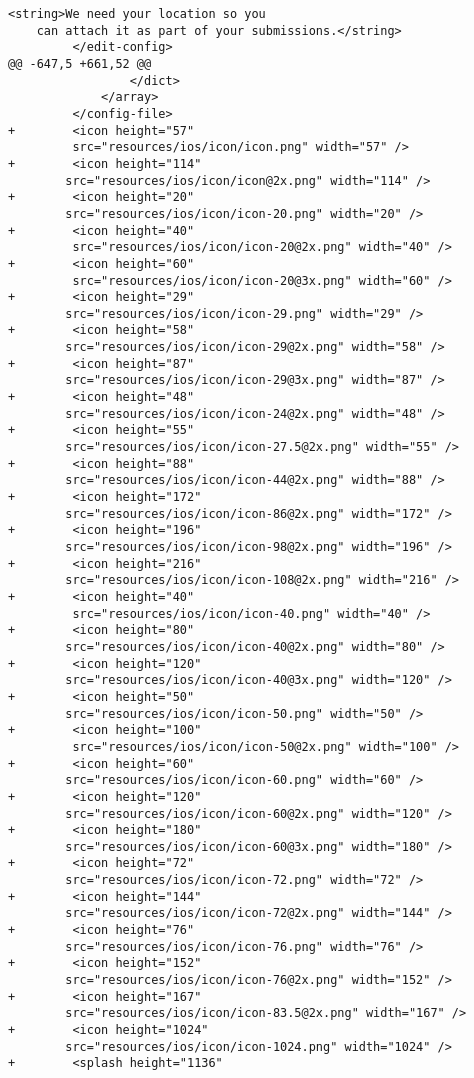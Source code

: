 \begin{lstlisting}[frame=single, label ={app-resource}, caption = Menggunakan \textit{resource} yang baru saja dihasilkan di dalam aplikasi ]
             <string>We need your location so you 
	can attach it as part of your submissions.</string>
         </edit-config>
@@ -647,5 +661,52 @@
                 </dict>
             </array>
         </config-file>
+        <icon height="57"
		 src="resources/ios/icon/icon.png" width="57" />
+        <icon height="114" 
		src="resources/ios/icon/icon@2x.png" width="114" />
+        <icon height="20" 
		src="resources/ios/icon/icon-20.png" width="20" />
+        <icon height="40"
		 src="resources/ios/icon/icon-20@2x.png" width="40" />
+        <icon height="60"
		 src="resources/ios/icon/icon-20@3x.png" width="60" />
+        <icon height="29" 
		src="resources/ios/icon/icon-29.png" width="29" />
+        <icon height="58" 
		src="resources/ios/icon/icon-29@2x.png" width="58" />
+        <icon height="87" 
		src="resources/ios/icon/icon-29@3x.png" width="87" />
+        <icon height="48" 
		src="resources/ios/icon/icon-24@2x.png" width="48" />
+        <icon height="55" 
		src="resources/ios/icon/icon-27.5@2x.png" width="55" />
+        <icon height="88" 
		src="resources/ios/icon/icon-44@2x.png" width="88" />
+        <icon height="172" 
		src="resources/ios/icon/icon-86@2x.png" width="172" />
+        <icon height="196" 
		src="resources/ios/icon/icon-98@2x.png" width="196" />
+        <icon height="216" 
		src="resources/ios/icon/icon-108@2x.png" width="216" />
+        <icon height="40"
		 src="resources/ios/icon/icon-40.png" width="40" />
+        <icon height="80" 
		src="resources/ios/icon/icon-40@2x.png" width="80" />
+        <icon height="120" 
		src="resources/ios/icon/icon-40@3x.png" width="120" />
+        <icon height="50" 
		src="resources/ios/icon/icon-50.png" width="50" />
+        <icon height="100"
		 src="resources/ios/icon/icon-50@2x.png" width="100" />
+        <icon height="60" 
		src="resources/ios/icon/icon-60.png" width="60" />
+        <icon height="120" 
		src="resources/ios/icon/icon-60@2x.png" width="120" />
+        <icon height="180" 
		src="resources/ios/icon/icon-60@3x.png" width="180" />
+        <icon height="72" 
		src="resources/ios/icon/icon-72.png" width="72" />
+        <icon height="144" 
		src="resources/ios/icon/icon-72@2x.png" width="144" />
+        <icon height="76" 
		src="resources/ios/icon/icon-76.png" width="76" />
+        <icon height="152" 
		src="resources/ios/icon/icon-76@2x.png" width="152" />
+        <icon height="167" 
		src="resources/ios/icon/icon-83.5@2x.png" width="167" />
+        <icon height="1024" 
		src="resources/ios/icon/icon-1024.png" width="1024" />
+        <splash height="1136" 

\end{lstlisting}
